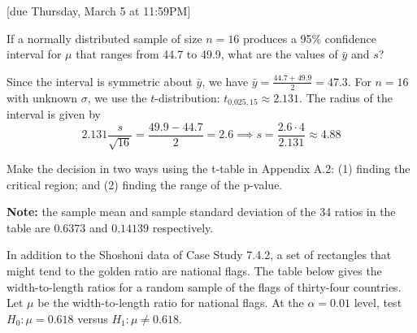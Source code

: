 \documentclass{article}
\begin{document}
[due Thursday, March 5 at 11:59PM]

\begin{probset}
\begin{prob}[\textbf{7.4.12}]
    If a normally distributed sample of size $n = 16$ produces a 95\% confidence interval for $\mu$ that ranges from 44.7 to 49.9, what are the values of $\bar{y}$ and $s$?

    \begin{soln}
        Since the interval is symmetric about $\bar{y}$, we have $\bar{y} = \frac{44.7 + 49.9}{2} = 47.3$. For $n = 16$ with unknown $\sigma$, we use the $t$-distribution: $t_{0.025, 15} \approx 2.131$. The radius of the interval is given by 
        \[
            2.131 \frac{s}{\sqrt{16}} = \frac{49.9 - 44.7}{2} = 2.6 \implies s = \frac{2.6 \cdot 4}{2.131} \approx 4.88
        \]
    \end{soln}
\end{prob}

\newpage

\begin{prob}[\textbf{7.4.20}]
    Make the decision in two ways using the
    t-table in Appendix A.2: (1) finding the critical region; and (2) finding the range of the p-value. 
    
    \textbf{Note:} the sample mean and sample standard deviation of the 34 ratios in the table are $0.6373$ and $0.14139$ respectively.
    
    In addition to the Shoshoni data of Case Study 7.4.2, a set of rectangles that might tend to the golden ratio are national flags. The table below gives the width-to-length ratios for a random sample of the flags of thirty-four countries. Let $\mu$ be the width-to-length ratio for national flags. At the $\alpha = 0.01$ level, test $H_0 : \mu = 0.618$ versus $H_1 : \mu \neq 0.618$.


\end{prob}
\end{probset}
\end{document}
